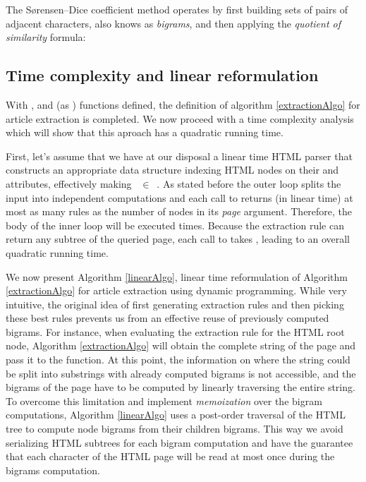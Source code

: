 \similarityTable

The Sørensen–Dice coefficient method operates by first building sets of pairs of adjacent characters, also knows as \emph{bigrams}, and then applying the \emph{quotient of similarity} formula:

\similarityAlgo


\subsection{Time complexity and linear reformulation}
\label{timecomplexityandlinearreformulation}

With ,  and  (as ) functions defined, the definition of algorithm \ref{extractionAlgo} for article extraction is completed. We now proceed with a time complexity analysis which will show that this aproach has a quadratic running time.

First, let's assume that we have at our disposal a linear time HTML parser that constructs an appropriate data structure indexing HTML nodes on their  and  attributes, effectively making ~$\in$~. As stated before the outer loop splits the input into independent computations and each call to  returns (in linear time) at most as many rules as the number of nodes in its \emph{page} argument. Therefore, the body of the inner loop will be executed  times. Because the extraction rule can return any subtree of the queried page, each call to  takes , leading to an overall quadratic running time.

We now present Algorithm \ref{linearAlgo}, linear time reformulation of Algorithm \ref{extractionAlgo} for article extraction using dynamic programming. While very intuitive, the original idea of first generating extraction rules and then picking these best rules prevents us from an effective reuse of previously computed bigrams. For instance, when evaluating the extraction rule for the HTML root node, Algorithm \ref{extractionAlgo} will obtain the complete string of the page and pass it to the  function. At this point, the information on where the string could be split into substrings with already computed bigrams is not accessible, and the bigrams of the page have to be computed by linearly traversing the entire string. To overcome this limitation and implement \emph{memoization} over the bigram computations, Algorithm \ref{linearAlgo} uses a post-order traversal of the HTML tree to compute node bigrams from their children bigrams. This way we avoid serializing HTML subtrees for each bigram computation and have the guarantee that each character of the HTML page will be read at most once during the bigrams computation.

